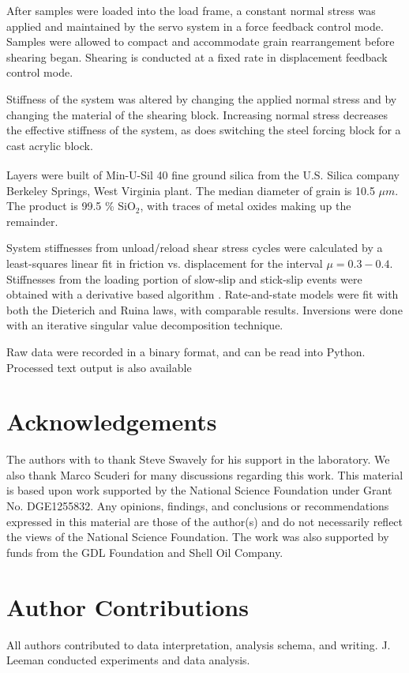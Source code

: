 \documentclass[11pt]{article}
\begin{document}
After samples were loaded into the load frame, a constant normal stress was
applied and maintained by the servo system in a force feedback control mode.
Samples were allowed to compact and accommodate grain rearrangement before
shearing began. Shearing is conducted at a fixed rate in displacement feedback
control mode.

Stiffness of the system was altered by changing the applied normal stress and by
changing the material of the shearing block. Increasing normal stress decreases
the effective stiffness of the system, as does switching the steel forcing block
for a cast acrylic block.

Layers were built of Min-U-Sil\textsuperscript{\textregistered} 40 fine ground
silica from the U.S. Silica\textsuperscript{\textregistered} company Berkeley
Springs, West Virginia plant. The median diameter of grain is 10.5 $\mu m$. The
product is 99.5 \% SiO$_2$, with traces of metal oxides making up the remainder.

System stiffnesses from unload/reload shear stress cycles were calculated by a
least-squares linear fit in friction vs. displacement for the interval $\mu =
0.3-0.4$. Stiffnesses from the loading portion of slow-slip and stick-slip
events were obtained with a derivative based algorithm \cite{Leeman:2015}.
Rate-and-state models were fit with both the Dieterich and
Ruina laws, with comparable results. Inversions were done with an iterative
singular value decomposition technique.

Raw data were recorded in a binary format, and can be read into Python\cite{Leeman:BiaxRead}.
Processed text output is also available



\section{Acknowledgements}
The authors with to thank Steve Swavely for his support in the laboratory.
We also thank Marco Scuderi for many discussions regarding this work. This
material is based upon work supported by the National Science Foundation under
Grant No. DGE1255832.  Any opinions, findings, and conclusions or
recommendations expressed in this material are those of the author(s) and do not
necessarily reflect the views of the National Science Foundation. The work was
also supported by funds from the GDL Foundation and Shell Oil Company.

\section{Author Contributions}
All authors contributed to data interpretation, analysis schema, and writing.
J. Leeman conducted experiments and data analysis.
\end{document}

